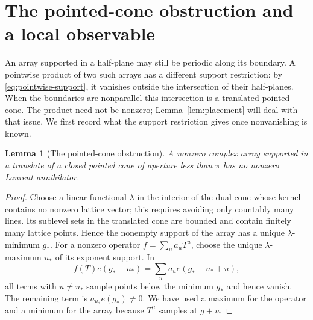 \documentclass[11pt]{article}
\numberwithin{equation}{section}
\newtheorem{lemma}[theorem]{Lemma}
\theoremstyle{definition}
\theoremstyle{remark}
\begin{document}
\section{The pointed-cone obstruction and a local observable}\label{sec:observable}
An array supported in a half-plane may still be periodic along its boundary. A pointwise product
of two such arrays has a different support restriction: by \eqref{eq:pointwise-support}, it vanishes
outside the intersection of their half-planes. When the boundaries are nonparallel this intersection
is a translated pointed cone. The product need not be nonzero; Lemma~\ref{lem:placement} will deal
with that issue. We first record what the support restriction gives once nonvanishing is known.

\begin{lemma}[The pointed-cone obstruction]\label{lem:cone}
A nonzero complex array supported in a translate of a closed pointed cone of aperture less than
$\pi$ has no nonzero Laurent annihilator.
\end{lemma}
\begin{proof}
Choose a linear functional $\lambda$ in the interior of the dual cone whose kernel contains no
nonzero lattice vector; this requires avoiding only countably many lines. Its sublevel sets in the
translated cone are bounded and contain finitely many lattice points. Hence the nonempty support of
the array has a unique $\lambda$-minimum $g_*$. For a nonzero operator $f=\sum_u a_uT^u$, choose the
unique $\lambda$-maximum $u_*$ of its exponent support. In
\[
 f(T)e(g_*-u_*)=\sum_u a_u e(g_*-u_*+u),
\]
all terms with $u\ne u_*$ sample points below the minimum $g_*$ and hence vanish. The remaining
term is $a_{u_*}e(g_*)\ne0$. We have used a maximum for the operator and a minimum for the array
because $T^u$ samples at $g+u$.
\end{proof}
\end{document}
